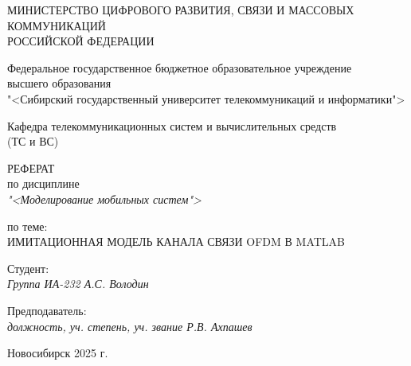 \thispagestyle{empty}

\begin{center}
    МИНИСТЕРСТВО ЦИФРОВОГО РАЗВИТИЯ, СВЯЗИ И МАССОВЫХ КОММУНИКАЦИЙ \\ РОССИЙСКОЙ ФЕДЕРАЦИИ

    \vspace{20pt}

    Федеральное государственное бюджетное образовательное учреждение  \\  высшего образования \\
    "<Сибирский государственный университет телекоммуникаций и информатики"> \\

    \vspace{20pt}

    Кафедра телекоммуникационных систем и вычислительных средств \\  (ТС и ВС)
\end{center}

\vfill

\begin{center}
    РЕФЕРАТ \\  
    по дисциплине \\
    \textit{"<Моделирование мобильных систем">}

    \vspace{20pt}

    по теме: \\
    \uppercase{Имитационная модель канала связи OFDM в Matlab}
\end{center}

\vfill

    \noindent Студент: \\
    \textit{Группа ИА-232 \hfill А.С. Володин}

    \vspace{20pt}

    \noindent Предподаватель: \\
    \textit{должность, уч. степень, уч. звание \hfill Р.В. Ахпашев}

\vfill

\begin{center}
    Новосибирск 2025 г.
\end{center}